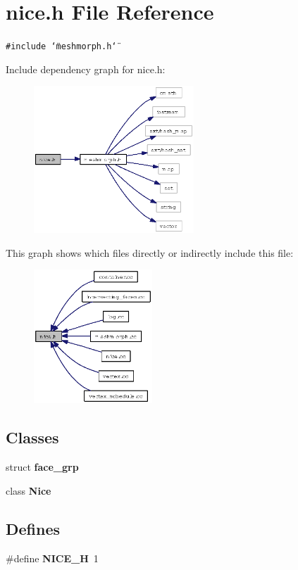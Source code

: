 \section{nice.h File Reference}
\label{nice_8h}
{\tt \#include \char`\"{}meshmorph.h\char`\"{}}\par


Include dependency graph for nice.h:\begin{figure}[H]
\begin{center}
\leavevmode
\includegraphics[width=170pt]{nice_8h__incl}
\end{center}
\end{figure}


This graph shows which files directly or indirectly include this file:\begin{figure}[H]
\begin{center}
\leavevmode
\includegraphics[width=126pt]{nice_8h__dep__incl}
\end{center}
\end{figure}
\subsection*{Classes}
\begin{CompactItemize}
\item 
struct {\bf face\_\-grp}
\item 
class {\bf Nice}
\end{CompactItemize}
\subsection*{Defines}
\begin{CompactItemize}
\item 
\#define {\bf NICE\_\-H}~1
\end{CompactItemize}
